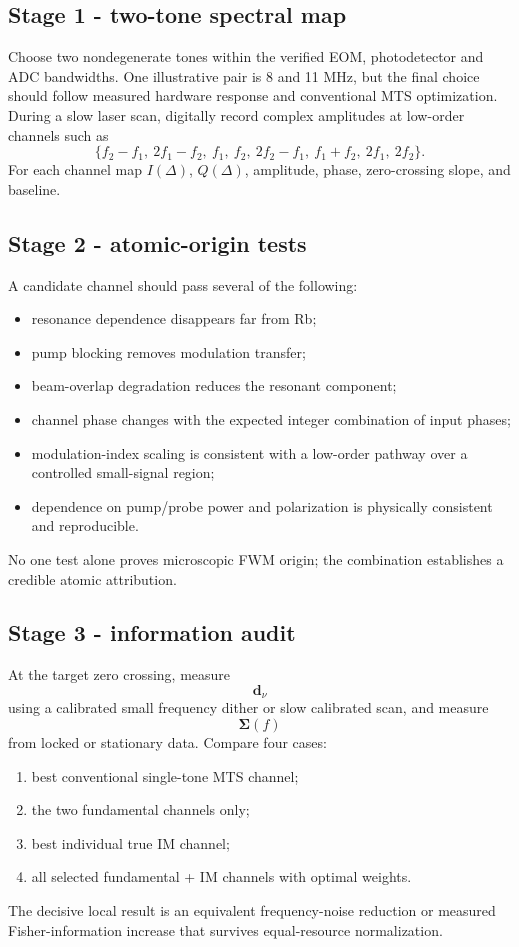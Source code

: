 \documentclass[10pt]{article}
\newcommand{\vect}[1]{\bm{#1}}
\begin{document}
\subsection{Stage 1 - two-tone spectral map}
Choose two nondegenerate tones within the verified EOM, photodetector and ADC bandwidths. One illustrative pair is 8 and 11 MHz, but the final choice should follow measured hardware response and conventional MTS optimization. During a slow laser scan, digitally record complex amplitudes at low-order channels such as
\begin{equation}
\{f_2-f_1,\ 2f_1-f_2,\ f_1,\ f_2,\ 2f_2-f_1,\ f_1+f_2,\ 2f_1,\ 2f_2\}.
\end{equation}
For each channel map $I(\Delta)$, $Q(\Delta)$, amplitude, phase, zero-crossing slope, and baseline.

\subsection{Stage 2 - atomic-origin tests}
A candidate channel should pass several of the following:
\begin{itemize}
\item resonance dependence disappears far from Rb;
\item pump blocking removes modulation transfer;
\item beam-overlap degradation reduces the resonant component;
\item channel phase changes with the expected integer combination of input phases;
\item modulation-index scaling is consistent with a low-order pathway over a controlled small-signal region;
\item dependence on pump/probe power and polarization is physically consistent and reproducible.
\end{itemize}
No one test alone proves microscopic FWM origin; the combination establishes a credible atomic attribution.

\subsection{Stage 3 - information audit}
At the target zero crossing, measure
\begin{equation}
\vect d_\nu
\end{equation}
using a calibrated small frequency dither or slow calibrated scan, and measure
\begin{equation}
\vect\Sigma(f)
\end{equation}
from locked or stationary data. Compare four cases:
\begin{enumerate}
\item best conventional single-tone MTS channel;
\item the two fundamental channels only;
\item best individual true IM channel;
\item all selected fundamental + IM channels with optimal weights.
\end{enumerate}
The decisive local result is an equivalent frequency-noise reduction or measured Fisher-information increase that survives equal-resource normalization.
\end{document}
